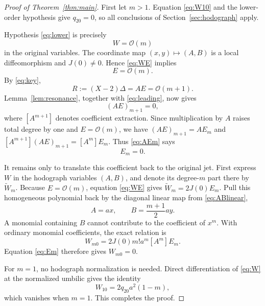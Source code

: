 \documentclass[11pt]{article}
\theoremstyle{remark}
\newcommand{\cO}{\mathcal O}
\begin{document}
\begin{proof}[Proof of Theorem~\ref{thm:main}]
First let \(m>1\).  Equation \eqref{eq:W10} and the lower-order hypothesis
give \(q_{20}=0\), so all conclusions of Section~\ref{sec:hodograph} apply.

Hypothesis \eqref{eq:lower} is precisely
\begin{equation}
                              W=\cO(m)                               \label{eq:Word}
\end{equation}
in the original variables.  The coordinate map \((x,y)\mapsto(A,B)\) is a
local diffeomorphism and \(J(0)\ne0\).  Hence \eqref{eq:WE} implies
\begin{equation}
                              E=\cO(m).                               \label{eq:Eord}
\end{equation}
By \eqref{eq:key},
\[
                           R:=(X-2)\Delta=AE=\cO(m+1).
\]
Lemma~\ref{lem:resonance}, together with \eqref{eq:leading}, now gives
\begin{equation}
                              [A^{m+1}](AE)_{m+1}=0,                  \label{eq:AEm}
\end{equation}
where \([A^{m+1}]\) denotes coefficient extraction.  Since multiplication
by \(A\) raises total degree by one and \(E=\cO(m)\), we have
\((AE)_{m+1}=AE_m\) and
\([A^{m+1}](AE)_{m+1}=[A^m]E_m\).  Thus \eqref{eq:AEm} says
\begin{equation}
                              [A^m]E_m=0.                             \label{eq:Em}
\end{equation}

It remains only to translate this coefficient back to the original jet.
First express \(W\) in the hodograph variables \((A,B)\), and denote its
degree-\(m\) part there by \(\widetilde W_m\).  Because \(E=\cO(m)\),
equation \eqref{eq:WE} gives
\(\widetilde W_m=2J(0)E_m\).  Pull this homogeneous polynomial back by the diagonal
linear map from \eqref{eq:ABlinear},
\[
                   A=ax,\qquad B=\frac{m+1}{2}ay.
\]
A monomial containing \(B\) cannot contribute to the coefficient of
\(x^m\).  With ordinary monomial coefficients, the exact relation is
\begin{equation}
 W_{m0}=2J(0)m!a^m[A^m]E_m.                            \label{eq:return}
\end{equation}
Equation \eqref{eq:Em} therefore gives \(W_{m0}=0\).

For \(m=1\), no hodograph normalization is needed.  Direct differentiation
of \eqref{eq:W} at the normalized umbilic gives the identity
\[
                              W_{10}=2q_{20}a^2(1-m),
\]
which vanishes when \(m=1\).  This completes the proof.
\end{proof}
\end{document}
